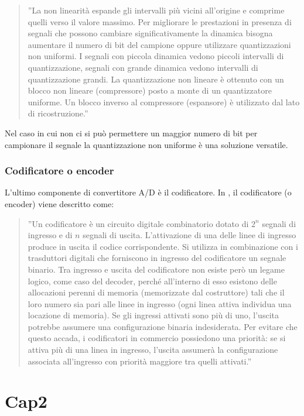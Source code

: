 \documentclass[a4paper]{report} %
\begin{document}
\begin{quote}
	''La non linearità espande gli intervalli più vicini all'origine e comprime quelli verso il valore massimo. Per migliorare le prestazioni in presenza di segnali che possono cambiare significativamente la dinamica bisogna aumentare il numero di bit del campione oppure utilizzare quantizzazioni non uniformi. I segnali con piccola dinamica vedono piccoli intervalli di quantizzazione, segnali con grande dinamica vedono intervalli di quantizzazione grandi. La quantizzazione non lineare è ottenuto con un blocco non lineare (compressore) posto a monte di un quantizzatore uniforme. Un blocco inverso al compressore (espansore) è utilizzato dal lato di ricostruzione.'' 
\end{quote}
Nel caso in cui non ci si può permettere un maggior numero di bit per campionare il segnale la quantizzazione non uniforme è una soluzione versatile.

\subsection{Codificatore o encoder}
L'ultimo componente di convertitore A/D è il codificatore. In \cite{art:rif.3}, il codificatore (o encoder) viene descritto come:
\begin{quote}
	''Un codificatore è un circuito digitale combinatorio dotato di $2^{n}$ segnali di ingresso e di $n$ segnali di uscita. L'attivazione di una delle linee di ingresso produce in uscita il codice corrispondente. Si utilizza in combinazione con i trasduttori digitali che forniscono in ingresso del codificatore un segnale binario. Tra ingresso e uscita del codificatore non esiste però un legame logico, come caso del decoder, perché all'interno di esso esistono delle allocazioni perenni di memoria (memorizzate dal costruttore) tali che il loro numero sia pari alle linee in ingresso (ogni linea attiva individua una locazione di memoria). Se gli ingressi attivati sono più di uno, l'uscita potrebbe assumere una configurazione binaria indesiderata. Per evitare che questo accada, i codificatori in commercio possiedono una priorità: se si attiva più di una linea in ingresso, l'uscita assumerà la configurazione associata all'ingresso con priorità maggiore tra quelli attivati.'' 
\end{quote}

\chapter{Cap2}
\end{document}
